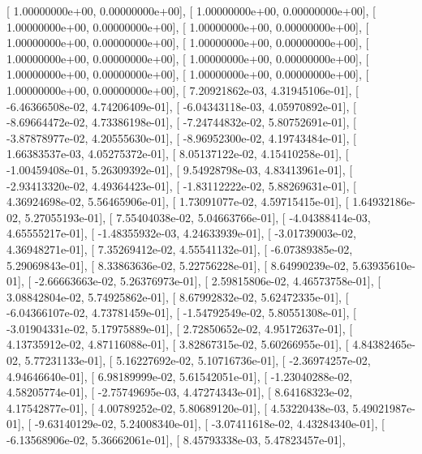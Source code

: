 \documentclass{article}
\begin{document}
       [  1.00000000e+00,   0.00000000e+00],
       [  1.00000000e+00,   0.00000000e+00],
       [  1.00000000e+00,   0.00000000e+00],
       [  1.00000000e+00,   0.00000000e+00],
       [  1.00000000e+00,   0.00000000e+00],
       [  1.00000000e+00,   0.00000000e+00],
       [  1.00000000e+00,   0.00000000e+00],
       [  1.00000000e+00,   0.00000000e+00],
       [  1.00000000e+00,   0.00000000e+00],
       [  1.00000000e+00,   0.00000000e+00],
       [  1.00000000e+00,   0.00000000e+00],
       [  7.20921862e-03,   4.31945106e-01],
       [ -6.46366508e-02,   4.74206409e-01],
       [ -6.04343118e-03,   4.05970892e-01],
       [ -8.69664472e-02,   4.73386198e-01],
       [ -7.24744832e-02,   5.80752691e-01],
       [ -3.87878977e-02,   4.20555630e-01],
       [ -8.96952300e-02,   4.19743484e-01],
       [  1.66383537e-03,   4.05275372e-01],
       [  8.05137122e-02,   4.15410258e-01],
       [ -1.00459408e-01,   5.26309392e-01],
       [  9.54928798e-03,   4.83413961e-01],
       [ -2.93413320e-02,   4.49364423e-01],
       [ -1.83112222e-02,   5.88269631e-01],
       [  4.36924698e-02,   5.56465906e-01],
       [  1.73091077e-02,   4.59715415e-01],
       [  1.64932186e-02,   5.27055193e-01],
       [  7.55404038e-02,   5.04663766e-01],
       [ -4.04388414e-03,   4.65555217e-01],
       [ -1.48355932e-03,   4.24633939e-01],
       [ -3.01739003e-02,   4.36948271e-01],
       [  7.35269412e-02,   4.55541132e-01],
       [ -6.07389385e-02,   5.29069843e-01],
       [  8.33863636e-02,   5.22756228e-01],
       [  8.64990239e-02,   5.63935610e-01],
       [ -2.66663663e-02,   5.26376973e-01],
       [  2.59815806e-02,   4.46573758e-01],
       [  3.08842804e-02,   5.74925862e-01],
       [  8.67992832e-02,   5.62472335e-01],
       [ -6.04366107e-02,   4.73781459e-01],
       [ -1.54792549e-02,   5.80551308e-01],
       [ -3.01904331e-02,   5.17975889e-01],
       [  2.72850652e-02,   4.95172637e-01],
       [  4.13735912e-02,   4.87116088e-01],
       [  3.82867315e-02,   5.60266955e-01],
       [  4.84382465e-02,   5.77231133e-01],
       [  5.16227692e-02,   5.10716736e-01],
       [ -2.36974257e-02,   4.94646640e-01],
       [  6.98189999e-02,   5.61542051e-01],
       [ -1.23040288e-02,   4.58205774e-01],
       [ -2.75749695e-03,   4.47274343e-01],
       [  8.64168323e-02,   4.17542877e-01],
       [  4.00789252e-02,   5.80689120e-01],
       [  4.53220438e-03,   5.49021987e-01],
       [ -9.63140129e-02,   5.24008340e-01],
       [ -3.07411618e-02,   4.43284340e-01],
       [ -6.13568906e-02,   5.36662061e-01],
       [  8.45793338e-03,   5.47823457e-01],
\end{document}
